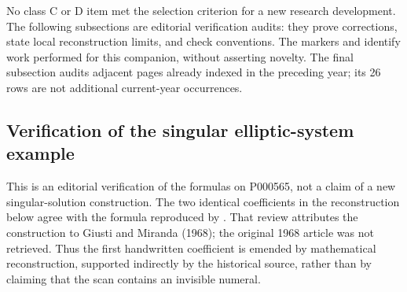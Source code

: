 \noindent No class C or D item met the selection criterion for a new research development. The following subsections are editorial verification audits: they prove corrections, state local reconstruction limits, and check conventions. The markers \ours{} and \oursComputed{} identify work performed for this companion, without asserting novelty. The final subsection audits adjacent pages already indexed in the preceding year; its 26 rows are not additional current-year occurrences.

\subsection{Verification of the singular elliptic-system example}

This is an editorial verification of the formulas on P000565, not a claim of a new singular-solution construction. The two identical coefficients in the reconstruction below agree with the formula reproduced by \citet[\S3.2, equation (3.3)]{mingione2006regularity}. That review attributes the construction to Giusti and Miranda (1968); the original 1968 article was not retrieved. Thus the first handwritten coefficient is emended by mathematical reconstruction, supported indirectly by the historical source, rather than by claiming that the scan contains an invisible numeral.

